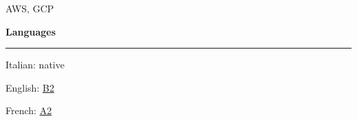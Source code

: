 \documentclass[11pt,letterpaper]{article}
\begin{document}
\begin{justify}
\begin{minipage}[t]{5.4cm}
\begin{itemize}[label={}, leftmargin=0pt]
                  \begin{item}
                        AWS, GCP
                  \end{item}
            \end{itemize}
      \end{minipage}
      \hfill
      \begin{minipage}[t]{2.9cm}
            \textbf{Languages}\strut
            \hrule
            \vspace{0.2cm}
            \begin{itemize}[label={}, leftmargin=0pt]
                  \begin{item}
                        Italian: native
                  \end{item}
                  \begin{item}
                        English:
                        \href{https://dariocurr.github.io/assets/doc/B2_english.pdf}{B2}
                  \end{item}
                  \begin{item}
                        French:
                        \href{https://dariocurr.github.io/assets/doc/A2_french.pdf}{A2}
                  \end{item}
            \end{itemize}
      \end{minipage}
\end{justify}
\end{document}
